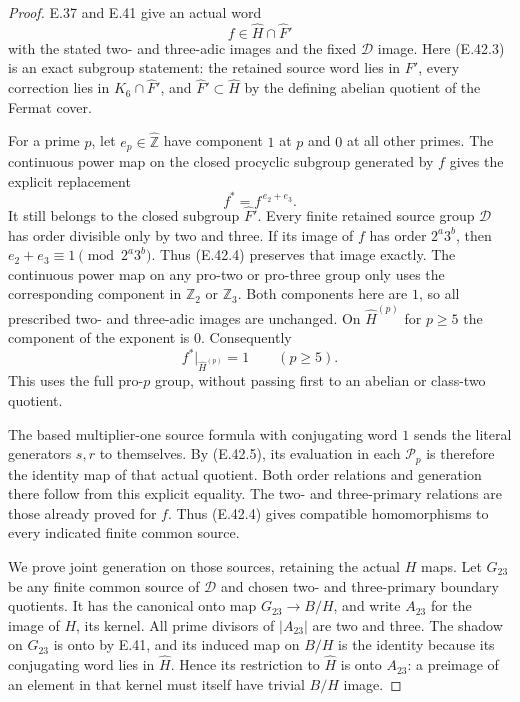 \begin{proof}
E.37 and E.41 give an actual word
\[
             f\in\widehat H\cap\widehat F'
 \tag{E.42.3}
\]
with the stated two- and three-adic images
and the fixed $\mathscr D$ image.
Here \textup{(E.42.3)} is an exact subgroup
statement: the retained source word lies
in $F'$, every correction lies in
$K_6\cap\widehat F'$, and
$\widehat F'\subset\widehat H$ by the
defining abelian quotient of the Fermat
cover.

For a prime $p$, let $e_p\in\widehat{\mathbb Z}$
have component $1$ at $p$ and $0$ at all
other primes.  The continuous power map
on the closed procyclic subgroup generated
by $f$ gives the explicit replacement
\[
                       f^\ast=f^{\,e_2+e_3}.
 \tag{E.42.4}
\]
It still belongs to the closed subgroup
$\widehat F'$.
Every finite retained source group
$\mathscr D$ has order divisible only by
two and three.  If its image of $f$ has
order $2^a3^b$, then
$e_2+e_3\equiv1\pmod{2^a3^b}$.
Thus \textup{(E.42.4)} preserves that
image exactly.
The continuous power map on any pro-two
or pro-three group only uses the corresponding
component in $\mathbb Z_2$ or $\mathbb Z_3$.
Both components here are $1$, so all
prescribed two- and three-adic images
are unchanged.
On $\widehat H^{(p)}$ for $p\ge5$ the
component of the exponent is $0$.
Consequently
\[
              f^\ast\big|_{\widehat H^{(p)}}=1
                            \qquad(p\ge5).
 \tag{E.42.5}
\]
This uses the full pro-$p$ group, without
passing first to an abelian or class-two
quotient.

The based multiplier-one source formula
with conjugating word $1$ sends the
literal generators $s,r$ to themselves.
By \textup{(E.42.5)}, its evaluation in
each $\mathscr P_p$ is therefore the
identity map of that actual quotient.
Both order relations and generation there
follow from this explicit equality.
The two- and three-primary relations are
those already proved for $f$.
Thus \textup{(E.42.4)} gives compatible
homomorphisms to every indicated finite
common source.

We prove joint generation on those sources,
retaining the actual $H$ maps.
Let $G_{23}$ be any finite common source
of $\mathscr D$ and chosen two- and
three-primary boundary quotients.
It has the canonical onto map
$G_{23}\to B/H$, and write
$A_{23}$ for the image of $H$, its kernel.
All prime divisors of $|A_{23}|$ are two
and three.
The shadow on $G_{23}$ is onto by E.41,
and its induced map on $B/H$ is the
identity because its conjugating word
lies in $\widehat H$.
Hence its restriction to $\widehat H$
is onto $A_{23}$: a preimage of an
element in that kernel must itself
have trivial $B/H$ image.


\end{proof}
